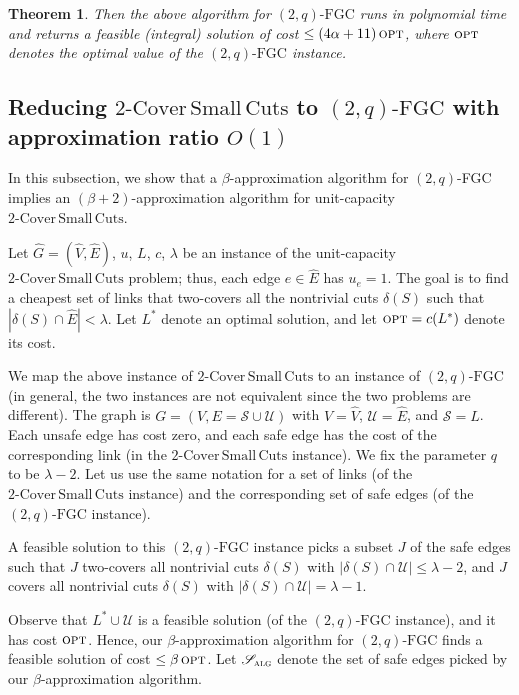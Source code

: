 \documentclass[11pt]{article}
\newtheorem{theorem}{Theorem}
\newcommand{\opt}{\textsc{opt}}
\newcommand{\safe}{\mathscr{S}}
\newcommand{\unsafe}{\mathscr{U}}
\newcommand{\fgc}{\mathrm{FGC}}
\newcommand{\J}{{J}}
\newcommand{\alg}{\textsc{alg}}
\newcommand{\twoqfgc}{(2,q)\text{-}\fgc}
\newcommand\capbound{\lambda}
\newcommand\hG{\hat{G}}
\newcommand\hE{\hat{E}}
\newcommand\hV{\hat{V}}
\newcommand\twoASC{\mathrm{2\text{-}Cover\,Small\,Cuts}}
\begin{document}
{{{\begin{theorem}
Then the above algorithm for $\twoqfgc$ runs in polynomial time and
returns a feasible (integral) solution of cost $\leq (4\alpha+11)\, \opt$,
where $\opt$ denotes the optimal value of the $\twoqfgc$ instance.
\end{theorem}
}

}


\medskip

\subsection*{Reducing $\twoASC$ to $\twoqfgc$ with approximation ratio $O(1)$}
{
In this subsection, we show that a $\beta$-approximation algorithm
for $(2,q)$-FGC implies an $(\beta+2)$-approximation algorithm for
unit-capacity $\twoASC$. 

Let $\hG=(\hV,\hE)$, $u$, $L$, $c$, $\capbound$ be an instance of
the unit-capacity $\twoASC$ problem; thus, each edge $e\in\hE$ has $u_e=1$.
The goal is to find a cheapest set of links that two-covers all the
nontrivial cuts $\delta(S)$ such that $|\delta(S)\cap\hE| <\capbound$.
Let $L^*$ denote an optimal solution, and let $\opt=c(L^*)$ denote its cost.


We map the above instance of $\twoASC$ to an instance of $\twoqfgc$ (in general, the two instances are not equivalent since the two problems are different).
The graph is $G=(V, E=\safe\cup\unsafe)$ with  $V=\hV$, $\unsafe=\hE$, and $\safe = L$.
Each unsafe edge has cost zero, and each safe edge has the cost of
the corresponding link (in the $\twoASC$ instance).
We fix the parameter $q$ to be $\capbound-2$.
Let us use the same notation for a set of links (of the $\twoASC$ instance)
and the corresponding set of safe edges (of the $\twoqfgc$ instance).

A feasible solution to this $\twoqfgc$ instance picks a subset $\J$
of the safe edges such that $\J$ two-covers all nontrivial cuts
$\delta(S)$ with $|\delta(S)\cap \unsafe| \leq \capbound-2$, and
$\J$ covers all nontrivial cuts $\delta(S)$ with $|\delta(S)\cap\unsafe|=\capbound-1$.

Observe that $L^*\cup\unsafe$ is a feasible solution (of the $\twoqfgc$ instance),
and it has cost $\opt$.
Hence, our $\beta$-approximation algorithm for $\twoqfgc$ finds
a feasible solution of cost $\leq\beta\,\opt$.
Let $\safe_{\alg}$ denote the set of safe edges picked by our
$\beta$-approximation algorithm.

}}
\end{document}
